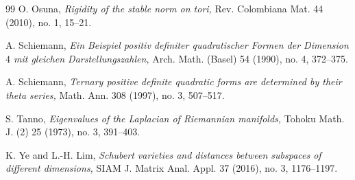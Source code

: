 \documentclass[11pt]{amsart}
\theoremstyle{remark}
\theoremstyle{definition}
\begin{document}
\begin{thebibliography}{99}
		 O. Osuna, {\em Rigidity of the stable norm on tori,} Rev. Colombiana Mat. 44 (2010), no. 1, 15--21.
		
		
		
		
		 A. Schiemann, {\em Ein Beispiel positiv definiter quadratischer Formen der Dimension $4$ mit gleichen Darstellungszahlen,} Arch. Math. (Basel) 54 (1990), no. 4, 372--375.
		
		 A. Schiemann, {\em Ternary positive definite quadratic forms are determined by their theta series,} Math. Ann. 308 (1997), no. 3, 507--517.
		
		 S. Tanno, {\em Eigenvalues of the Laplacian of Riemannian manifolds,} Tohoku Math. J. (2) 25 (1973), no. 3, 391--403.
		
		
		 K. Ye and L.-H. Lim, \emph{Schubert varieties and distances between subspaces of different dimensions,} SIAM J. Matrix Anal. Appl. 37 (2016), no. 3, 1176--1197.
		
		
		
	\end{thebibliography}
	
\end{document}
